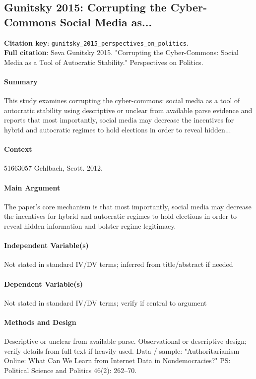 \documentclass[12pt]{article}
\begin{document}
\subsection{Gunitsky 2015: Corrupting the Cyber-Commons Social Media as...}
\textbf{Citation key}: \texttt{gunitsky\_2015\_perspectives\_on\_politics}.\\
\textbf{Full citation}: Seva Gunitsky 2015. "Corrupting the Cyber-Commons: Social Media as a Tool of Autocratic Stability." Perspectives on Politics.

\paragraph{Summary} This study examines corrupting the cyber-commons: social media as a tool of autocratic stability using descriptive or unclear from available parse evidence and reports that most importantly, social media may decrease the incentives for hybrid and autocratic regimes to hold elections in order to reveal hidden...

\paragraph{Context} 51663057 Gehlbach, Scott. 2012.

\paragraph{Main Argument} The paper's core mechanism is that most importantly, social media may decrease the incentives for hybrid and autocratic regimes to hold elections in order to reveal hidden information and bolster regime legitimacy.

\paragraph{Independent Variable(s)} Not stated in standard IV/DV terms; inferred from title/abstract if needed

\paragraph{Dependent Variable(s)} Not stated in standard IV/DV terms; verify if central to argument

\paragraph{Methods and Design} Descriptive or unclear from available parse. Observational or descriptive design; verify details from full text if heavily used. Data / sample: "Authoritarianism Online: What Can We Learn from Internet Data in Nondemocracies?" PS: Political Science and Politics 46(2): 262--70.
\end{document}
